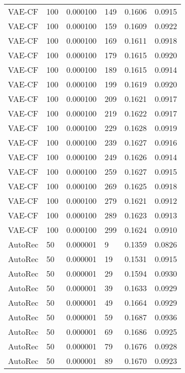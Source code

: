\begin{tabular}{llrlrr}
  VAE-CF &  100 &  0.000100 &   149 &  0.1606 &       0.0915 \\
  VAE-CF &  100 &  0.000100 &   159 &  0.1609 &       0.0922 \\
  VAE-CF &  100 &  0.000100 &   169 &  0.1611 &       0.0918 \\
  VAE-CF &  100 &  0.000100 &   179 &  0.1615 &       0.0920 \\
  VAE-CF &  100 &  0.000100 &   189 &  0.1615 &       0.0914 \\
  VAE-CF &  100 &  0.000100 &   199 &  0.1619 &       0.0920 \\
  VAE-CF &  100 &  0.000100 &   209 &  0.1621 &       0.0917 \\
  VAE-CF &  100 &  0.000100 &   219 &  0.1622 &       0.0917 \\
  VAE-CF &  100 &  0.000100 &   229 &  0.1628 &       0.0919 \\
  VAE-CF &  100 &  0.000100 &   239 &  0.1627 &       0.0916 \\
  VAE-CF &  100 &  0.000100 &   249 &  0.1626 &       0.0914 \\
  VAE-CF &  100 &  0.000100 &   259 &  0.1627 &       0.0915 \\
  VAE-CF &  100 &  0.000100 &   269 &  0.1625 &       0.0918 \\
  VAE-CF &  100 &  0.000100 &   279 &  0.1621 &       0.0912 \\
  VAE-CF &  100 &  0.000100 &   289 &  0.1623 &       0.0913 \\
  VAE-CF &  100 &  0.000100 &   299 &  0.1624 &       0.0910 \\
 AutoRec &   50 &  0.000001 &     9 &  0.1359 &       0.0826 \\
 AutoRec &   50 &  0.000001 &    19 &  0.1531 &       0.0915 \\
 AutoRec &   50 &  0.000001 &    29 &  0.1594 &       0.0930 \\
 AutoRec &   50 &  0.000001 &    39 &  0.1633 &       0.0929 \\
 AutoRec &   50 &  0.000001 &    49 &  0.1664 &       0.0929 \\
 AutoRec &   50 &  0.000001 &    59 &  0.1687 &       0.0936 \\
 AutoRec &   50 &  0.000001 &    69 &  0.1686 &       0.0925 \\
 AutoRec &   50 &  0.000001 &    79 &  0.1676 &       0.0928 \\
 AutoRec &   50 &  0.000001 &    89 &  0.1670 &       0.0923 \\

\end{tabular}
